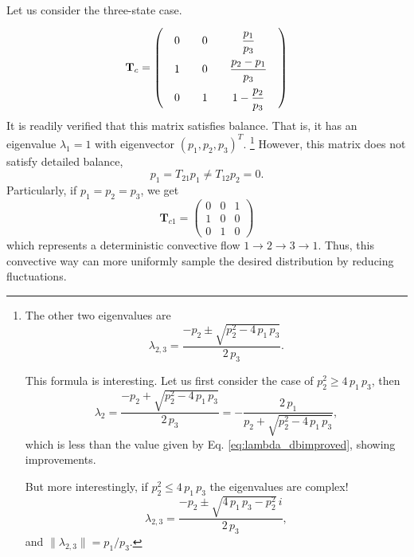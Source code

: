\documentclass[12pt]{article}
\begin{document}
Let us consider the three-state case.
$$
\mathbf T_c
=
\left(
  \arraycolsep=10.0pt\def\arraystretch{2.0}
  \begin{array}{ccc}
    0     &   0   &   \dfrac{p_1}{p_3}   \\
    1     &   0   &   \dfrac{p_2 - p_1}{p_3} \\
    0     &   1   &   1 - \dfrac{p_2}{p_3}
  \end{array}
\right)
$$
It is readily verified that this matrix satisfies balance.
That is, it has an eigenvalue $\lambda_1 = 1$
with eigenvector $(p_1, p_2, p_3)^T$.
\footnote{
The other two eigenvalues are
$$
\lambda_{2,3}
=
\frac{-p_2 \pm \sqrt{p_2^2 - 4 \, p_1 \, p_3} } { 2 \, p_3 }.
$$

This formula is interesting.
Let us first consider the case of $p_2^2 \ge 4 \, p_1 \, p_3$,
then
$$
\lambda_2 =
\frac{-p_2 + \sqrt{p_2^2 - 4 \, p_1 \, p_3} } { 2 \, p_3 }
=
-\frac{2 \, p_1 }{p_2 + \sqrt{p_2^2 - 4 \, p_1 \, p_3} },
$$
which is less than the value given by Eq. \eqref{eq:lambda_dbimproved},
showing improvements.

But more interestingly, if $p_2^2 \le 4 \, p_1 \, p_3$
the eigenvalues are complex!
$$
\lambda_{2,3}
=
\frac{-p_2 \pm \sqrt{4 \, p_1 \, p_3 - p_2^2} \, i } { 2 \, p_3 },
$$
and $\|\lambda_{2,3}\| = p_1/p_3$.
%
}
However, this matrix does not satisfy detailed balance,
$$
p_1 = T_{21} p_1 \ne T_{12} p_2 = 0.
$$
Particularly, if $p_1 = p_2 = p_3$, we get
$$
\mathbf T_{c1}
=
\left(
  \begin{array}{ccc}
    0     &   0   &   1   \\
    1     &   0   &   0 \\
    0     &   1   &   0
  \end{array}
\right)
$$
which represents a deterministic convective flow
$1\rightarrow 2 \rightarrow 3 \rightarrow 1$.
Thus, this convective way can more uniformly
sample the desired distribution by reducing fluctuations.
\end{document}
